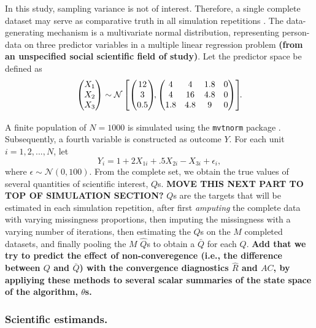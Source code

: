 \documentclass[Royal,times,sageh]{sagej}
\begin{document}
In this study, sampling variance is not of interest. Therefore, a single
complete dataset may serve as comparative truth in all simulation
repetitions \citep{vink14}. The data-generating mechanism is a
multivariate normal distribution, representing person-data on three
predictor variables in a multiple linear regression problem
\textbf{(from an unspecified social scientific field of study)}. Let the
predictor space be defined as \[
\begin{aligned}
\begin{pmatrix}X_1\\
X_2\\
X_3
\end{pmatrix} \sim \mathcal{N}
\begin{bmatrix}
\begin{pmatrix}
12\\
3\\
0.5
\end{pmatrix}\!\!,
\begin{pmatrix}
4 & 4 & 1.8 & 0\\
4 & 16 & 4.8 & 0\\
1.8 & 4.8 & 9 & 0
\end{pmatrix}
\end{bmatrix}\!\!\text{.}\\[2\jot]
\end{aligned}
\] A finite population of \(N=1000\) is simulated using the
\texttt{mvtnorm} package \citep{mvtnorm}. Subsequently, a fourth
variable is constructed as outcome \(Y\). For each unit
\(i = 1, 2,..., N\), let \[
Y_i = 1 + 2X_{1i} +.5X_{2i} - X_{3i} + \epsilon_i ,
\] where \(\epsilon \sim \mathcal{N}(0, 100)\). From the complete set,
we obtain the true values of several quantities of scientific interest,
\(Q\)s. \textbf{MOVE THIS NEXT PART TO TOP OF SIMULATION SECTION?}
\(Q\)s are the targets that will be estimated in each simulation
repetition, after first \emph{amputing} the complete data with varying
missingness proportions, then imputing the missingness with a varying
number of iterations, then estimating the \(Q\)s on the \(M\) completed
datasets, and finally pooling the \(M\) \(\hat{Q}\)s to obtain a
\(\bar{Q}\) for each \(Q\). \textbf{Add that we try to predict the
effect of non-converegence (i.e., the difference between \(Q\) and
\(\bar{Q}\)) with the convergence diagnostics \(\widehat{R}\) and
\(AC\), by appliying these methods to several scalar summaries of the
state space of the algorithm, \(\theta\)s.}

\hypertarget{scientific-estimands.}{%
\subsubsection{Scientific estimands.}\label{scientific-estimands.}}
\end{document}

